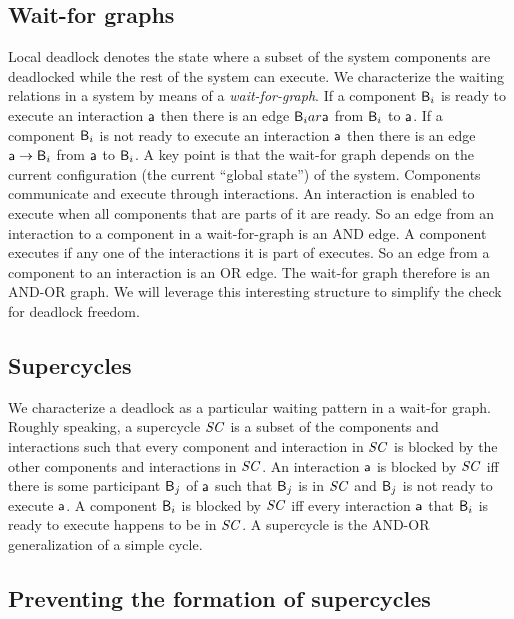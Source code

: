 \subsection{Wait-for graphs}

Local deadlock denotes the state where a subset of the system components are deadlocked while the rest of the system can execute.
%
We characterize the waiting relations in a system by means of a {\em wait-for-graph}. 
If a component $\mathsf{B}_i$ is ready to execute an interaction $\mathsf{a}$ then there is an edge $\mathsf{B}_i ar \mathsf{a}$ from $\mathsf{B}_i$ to $\mathsf{a}$.
If a component $\mathsf{B}_i$ is not ready to execute an interaction $\mathsf{a}$ then there is an edge $\mathsf{a} \rightarrow \mathsf{B}_i$ from $\mathsf{a}$ to $\mathsf{B}_i$.
A key point is that the wait-for graph depends on the current configuration (\ie the current ``global state'') of the system.
%
Components communicate and execute through interactions. 
An interaction is enabled to execute when all components that 
are parts of it are ready. 
So an edge from an interaction to a component in a wait-for-graph
is an AND edge. 
A component executes if any one of the interactions it is part of
executes. So an edge from a component to an interaction is an OR
edge. 
The wait-for graph therefore is an AND-OR graph. 
We will leverage this interesting structure to simplify the
check for deadlock freedom. 



\subsection{Supercycles}

We characterize a deadlock as a particular waiting pattern in a wait-for graph.
Roughly speaking, a supercycle $\mathit{SC}$ is a subset of the components and interactions such that every component and interaction in $\mathit{SC}$ is blocked by
the other components and interactions in $\mathit{SC}$. 
An interaction $\mathsf{a}$ is blocked by $\mathit{SC}$ iff there is some participant $\mathsf{B}_j$ of $\mathsf{a}$ such that $\mathsf{B}_j$ is in $\mathit{SC}$ and $\mathsf{B}_j$ is not ready to
execute $\mathsf{a}$.
A component $\mathsf{B}_i$ is blocked by $\mathit{SC}$ iff every interaction $\mathsf{a}$ that $\mathsf{B}_i$ is ready to execute happens to be in $\mathit{SC}$.
A supercycle is the AND-OR generalization of a simple cycle.



\subsection{Preventing the formation of supercycles}

